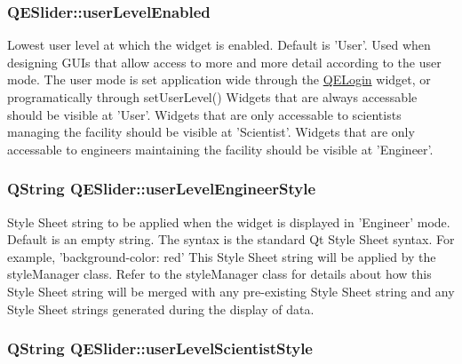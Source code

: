 \hypertarget{classQESlider_a1cd3bdc1252e8df1fe4769ec93748d8a}{
\subsubsection[{userLevelEnabled}]{ QESlider::userLevelEnabled}}
\label{classQESlider_a1cd3bdc1252e8df1fe4769ec93748d8a}
Lowest user level at which the widget is enabled. Default is 'User'. Used when designing GUIs that allow access to more and more detail according to the user mode. The user mode is set application wide through the \hyperlink{classQELogin}{QELogin} widget, or programatically through setUserLevel() Widgets that are always accessable should be visible at 'User'. Widgets that are only accessable to scientists managing the facility should be visible at 'Scientist'. Widgets that are only accessable to engineers maintaining the facility should be visible at 'Engineer'. \hypertarget{classQESlider_a29aad01614cf12b140123348a37bdfd0}{
\subsubsection[{userLevelEngineerStyle}]{\setlength{\rightskip}{0pt plus 5cm}QString QESlider::userLevelEngineerStyle}}
\label{classQESlider_a29aad01614cf12b140123348a37bdfd0}
Style Sheet string to be applied when the widget is displayed in 'Engineer' mode. Default is an empty string. The syntax is the standard Qt Style Sheet syntax. For example, 'background-\/color: red' This Style Sheet string will be applied by the styleManager class. Refer to the styleManager class for details about how this Style Sheet string will be merged with any pre-\/existing Style Sheet string and any Style Sheet strings generated during the display of data. \hypertarget{classQESlider_a352f3029807d1a093bb471c8db7aaf41}{
\subsubsection[{userLevelScientistStyle}]{\setlength{\rightskip}{0pt plus 5cm}QString QESlider::userLevelScientistStyle}}
